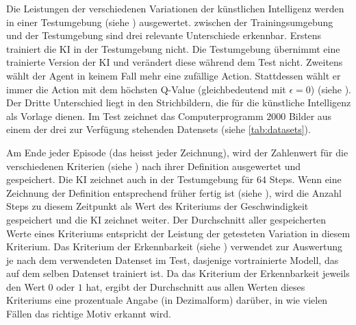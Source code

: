 Die Leistungen der verschiedenen Variationen der künstlichen Intelligenz werden
in einer Testumgebung (siehe ) ausgewertet. zwischen der
Trainingsumgebung und der Testumgebung sind drei relevante Unterschiede
erkennbar. Erstens trainiert die KI in der Testumgebung nicht. Die Testumgebung
übernimmt eine trainierte Version der KI und verändert diese während dem Test
nicht. Zweitens wählt der Agent in keinem Fall mehr eine zufällige Action.
Stattdessen wählt er immer die Action mit dem höchsten Q-Value (gleichbedeutend
mit $\epsilon = 0$) (siehe ). Der Dritte Unterschied
liegt in den Strichbildern, die für die künstliche Intelligenz als Vorlage
dienen. Im Test zeichnet das Computerprogramm $2000$ Bilder aus einem der drei
zur Verfügung stehenden Datensets (siehe \autoref{tab:datasets}). 

Am Ende jeder Episode (das heisst jeder Zeichnung), wird der Zahlenwert für die
verschiedenen Kriterien (siehe ) nach ihrer Definition
ausgewertet und gespeichert. Die KI zeichnet auch in der Testumgebung für $64$
Steps. Wenn eine Zeichnung der Definition entsprechend früher fertig ist (siehe
), wird die Anzahl Steps zu diesem Zeitpunkt als Wert
des Kriteriums der Geschwindigkeit gespeichert und die KI zeichnet weiter. Der
Durchschnitt aller gespeicherten Werte eines Kriteriums entspricht der Leistung
der getesteten Variation in diesem Kriterium. Das Kriterium der Erkennbarkeit
(siehe ) verwendet zur Auswertung je nach dem
verwendeten Datenset im Test, dasjenige vortrainierte Modell, das auf dem selben
Datenset trainiert ist. Da das Kriterium der Erkennbarkeit jeweils den Wert $0$
oder $1$ hat, ergibt der Durchschnitt aus allen Werten dieses Kriteriums eine
prozentuale Angabe (in Dezimalform) darüber, in wie vielen Fällen das richtige
Motiv erkannt wird.



